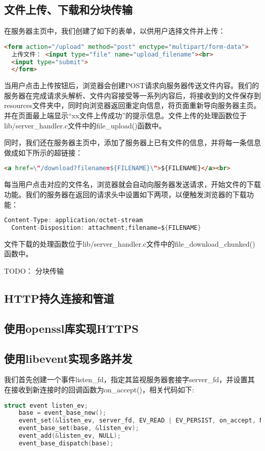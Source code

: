 \documentclass[a4paper]{article}
\begin{document}
\subsection{文件上传、下载和分块传输}
在服务器主页中，我们创建了如下的表单，以供用户选择文件并上传：
\begin{lstlisting}[language=html]
  <form action="/upload" method="post" enctype="multipart/form-data">
  上传文件： <input type="file" name="upload_filename"><br>
  <input type="submit">
  </form>
\end{lstlisting}
当用户点击上传按钮后，浏览器会创建POST请求向服务器传送文件内容。我们的服务器在完成请求头解析、文件内容接受等一系列内容后，将接收到的文件保存到resources文件夹中，同时向浏览器返回重定向信息，将页面重新导向服务器主页。并在页面最上端显示“xx文件上传成功”的提示信息。文件上传的处理函数位于lib/server\_handler.c文件中的file\_upload()函数中。

同时，我们还在服务器主页中，添加了服务器上已有文件的信息，并将每一条信息做成如下所示的超链接：
\begin{lstlisting}[language=html]
  <a href=\"/download?filename=${FILENAME}\">${FILENAME}</a><br>
\end{lstlisting}

每当用户点击对应的文件名，浏览器就会自动向服务器发送请求，开始文件的下载功能。我们的服务器在返回的请求头中设置如下两项，以便触发浏览器的下载功能：
\begin{lstlisting}[language=C]
  Content-Type: application/octet-stream
  Content-Disposition: attachment;filename=${FILENAME}
\end{lstlisting}

文件下载的处理函数位于lib/server\_handler.c文件中的file\_download\_chunked()函数中。

TODO： 分块传输


\subsection{HTTP持久连接和管道}

\subsection{使用openssl库实现HTTPS}

\subsection{使用libevent实现多路并发}
我们首先创建一个事件listen\_fd，指定其监视服务器套接字server\_fd，并设置其在接收到新连接时的回调函数为on\_accept()，相关代码如下:
\begin{lstlisting}[language=C,title=server.c]
  struct event listen_ev;
	base = event_base_new();
	event_set(&listen_ev, server_fd, EV_READ | EV_PERSIST, on_accept, NULL);
	event_base_set(base, &listen_ev);
	event_add(&listen_ev, NULL);
	event_base_dispatch(base);
\end{lstlisting}
\end{document}
